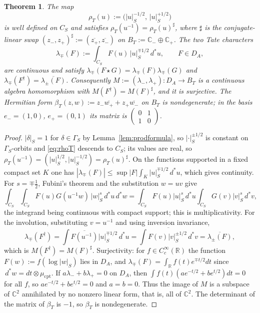 \documentclass[11pt]{amsart}
\newtheorem{theorem}{Theorem}[section]
\theoremstyle{definition}
\theoremstyle{remark}
\newcommand{\C}{\mathbb C}
\newcommand{\R}{\mathbb R}
\newcommand{\dstar}{\,d^{*}}
\newcommand{\DA}{D_A}
\newcommand{\BT}{B_T}
\begin{document}
\begin{theorem}\label{thm:tate}
The map
\begin{equation}\label{eq:rhoT}
\rho_T(u):=\bigl(|u|_S^{-1/2},\,|u|_S^{+1/2}\bigr)
\end{equation}
is well defined on $C_S$ and
satisfies $\rho_T(u^{-1})=\rho_T(u)^{\sharp}$, where $\sharp$ is the
conjugate-linear swap
$(z_-,z_+)^{\sharp}:=(\overline{z_+},\overline{z_-})$ on
$\BT:=\C_-\oplus\C_+$.  The two \emph{Tate characters}
\begin{equation}\label{eq:lambdadef}
\lambda_{\mp}(F):=\int_{C_S}F(u)\,|u|_S^{\mp1/2}\dstar u,\qquad F\in\DA,
\end{equation}
are continuous and satisfy
$\lambda_{\mp}(F\star G)=\lambda_{\mp}(F)\lambda_{\mp}(G)$ and
$\lambda_{\mp}(F^{\dagger})=\overline{\lambda_{\pm}(F)}$.  Consequently
$M:=(\lambda_-,\lambda_+):\DA\to\BT$ is a continuous algebra homomorphism with
$M(F^{\dagger})=M(F)^{\sharp}$, and it is surjective.  The Hermitian form
$\beta_T(z,w):=z_-\overline{w_+}+z_+\overline{w_-}$ on $\BT$ is nondegenerate;
in the basis $e_-=(1,0)$, $e_+=(0,1)$ its matrix is
$\left(\begin{smallmatrix}0&1\\1&0\end{smallmatrix}\right)$.
\end{theorem}

\begin{proof}
$|\delta|_S=1$ for $\delta\in\Gamma_S$ by Lemma~\ref{lem:prodformula}, so
$|\cdot|_S^{\pm1/2}$ is constant on $\Gamma_S$-orbits and \eqref{eq:rhoT}
descends to $C_S$; its values are real, so
$\rho_T(u^{-1})=(|u|_S^{1/2},|u|_S^{-1/2})=\rho_T(u)^{\sharp}$.  On the
functions supported in a fixed compact set $K$ one has
$|\lambda_{\mp}(F)|\le\sup|F|\int_K|u|_S^{\mp1/2}\dstar u$, which gives
continuity.  For $s=\mp\tfrac12$, Fubini's theorem and the substitution $w=uv$
give
\[
\int_{C_S}\int_{C_S}F(u)G(u^{-1}w)\,|w|_S^{s}\dstar u\dstar w
=\int_{C_S}F(u)|u|_S^{s}\dstar u\int_{C_S}G(v)|v|_S^{s}\dstar v ,
\]
the integrand being continuous with compact support; this is
multiplicativity.  For the involution, substituting $v=u^{-1}$ and using
inversion invariance,
\[
\lambda_{\mp}(F^{\dagger})=\int\overline{F(u^{-1})}|u|_S^{\mp1/2}\dstar u
=\overline{\int F(v)|v|_S^{\pm1/2}\dstar v}=\overline{\lambda_{\pm}(F)},
\]
which is $M(F^{\dagger})=M(F)^{\sharp}$.  Surjectivity: for
$f\in C_c^{\infty}(\R)$ the function $F(w):=f(\log|w|_S)$ lies in $\DA$, and
$\lambda_{\mp}(F)=\int_{\R}f(t)e^{\mp t/2}dt$ since $\dstar w=dt\otimes
\mu_{\mathrm{cpt}}$.  If $a\lambda_-+b\lambda_+=0$ on $\DA$, then
$\int f(t)(ae^{-t/2}+be^{t/2})dt=0$ for all $f$, so $ae^{-t/2}+be^{t/2}=0$ and
$a=b=0$.  Thus the image of $M$ is a subspace of $\C^{2}$ annihilated by no
nonzero linear form, that is, all of $\C^{2}$.  The determinant of the matrix
of $\beta_T$ is $-1$, so $\beta_T$ is nondegenerate.
\end{proof}
\end{document}
